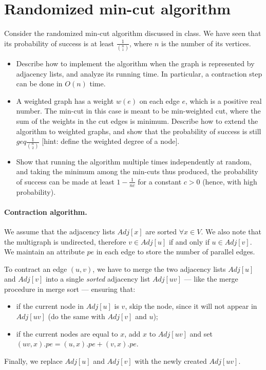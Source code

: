 \section{Randomized min-cut algorithm}

Consider the randomized min-cut algorithm discussed in class.
We have seen that its probability of success is at least $\frac{1}{{{n} \choose {1}}}$,
where $n$ is the number of its vertices.

\begin{itemize}
\item Describe how to implement the algorithm when the graph is represented by adjacency
lists, and analyze its running time.
In particular, a contraction step can be done in $O(n)$ time.
\item A weighted graph has a weight $w(e)$ on each edge $e$, which is a positive
real number.
The min-cut in this case is meant to be min-weighted cut, where the sum of the weights
in the cut edges is minimum.
Describe how to extend the algorithm to weighted graphs, and show that the probability
of success is still $geq \frac{1}{{{n} \choose {2}}}$ [hint: define the weighted degree
of a node].
\item Show that running the algorithm multiple times independently at random, and
taking the minimum among the min-cuts thus produced, the probability of success
can be made at least $1 - \frac{1}{nc}$ for a constant $c > 0$
(hence, with high probability).
\end{itemize}

\vspace{0.5cm}
\paragraph{Contraction algorithm.}
We assume that the adjacency lists $Adj[x]$ are sorted $\forall x \in V$. We also note that the multigraph is undirected, therefore $v\in Adj[u]$ if and only if $u\in Adj[v]$. We maintain an attribute $pe$ in each edge to store the number of parallel edges.

To contract an edge $(u, v)$, we have to merge the two adjacency lists $Adj[u]$ and $Adj[v]$ into a single \emph{sorted} adjacency list $Adj[uv]$ --- like the merge procedure in merge sort --- ensuring that:
\begin{itemize}
  \item if the current node in $Adj[u]$ is $v$, skip the node, since it will not appear in $Adj[uv]$ (do the same with $Adj[v]$ and $u$);
  \item if the current nodes are equal to $x$, add $x$ to $Adj[uv]$ and set $(uv, x).pe = (u,x).pe + (v,x).pe$.
\end{itemize}
Finally, we replace $Adj[u]$ and $Adj[v]$ with the newly created $Adj[uv]$.

